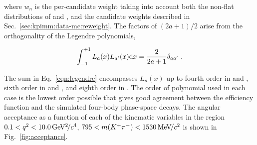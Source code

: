 \noindent where $w_{n}$ is the per-candidate weight taking into account both the non-flat distributions of \qsq and \mkpi, and the candidate weights described in Sec.~\ref{sec:kpimm:data-mc:reweight}. The factors of $(2a + 1)/2$ arise from the orthogonality of the Legendre polynomials,
 
\begin{equation}
\int_{-1}^{+1} L_{a}(x) L_{a'}(x) \mathrm{d} x = \frac{2}{2 a + 1}\delta_{ a a'}  ~.
\end{equation}

 The sum in Eq.~\ref{eqn:legendre} encompasses $L_n(x)$ up to fourth order in \ctl and \mkpip, sixth order in \phip and \qsqp, and eighth order in \ctk. The order of polynomial used in each case is the lowest order possible that gives good agreement between the efficiency function and the simulated four-body \BdToKpimm phase-space decays. The angular acceptance as a function of each of the kinematic variables in the region $0.1<{q^2}<10.0{\mathrm{\,Ge\kern -0.1em V^2\!/}c^4}$, $795<m({{K}^+}{{\pi}^-})<1530{\mathrm{\,Me\kern -0.1em V\!/}c^2}$ is shown in Fig.~\ref{fig:acceptance}.

